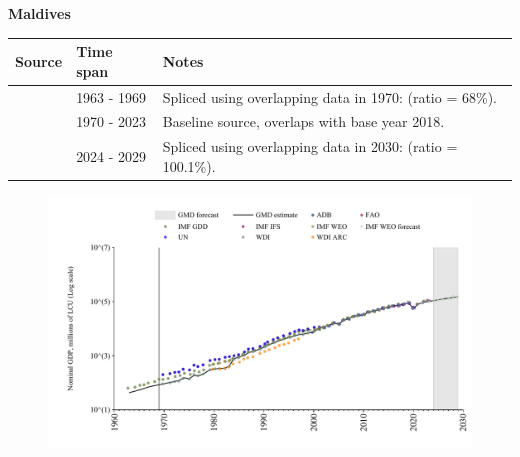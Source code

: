 \documentclass[12pt,a4paper,landscape]{article}
\begin{document}
\begin{adjustbox}{max totalsize={\paperwidth}{\paperheight},center}
\begin{minipage}[t][\textheight][t]{\textwidth}
\vspace*{0.5cm}
{}
\begin{center}
{\Large\bfseries Maldives}
\end{center}
\vspace{0.5cm}
\begin{table}[H]
\centering
\small
\begin{tabular}{|l|l|l|}
\hline
\textbf{Source} & \textbf{Time span} & \textbf{Notes} \\
\hline
\rowcolor{white}\cite{IMF_GDD}& 1963 - 1969 &Spliced using overlapping data in 1970: (ratio = 68\%).\\
\rowcolor{lightgray}\cite{WDI}& 1970 - 2023 &Baseline source, overlaps with base year 2018.\\
\rowcolor{white}\cite{IMF_WEO_forecast}& 2024 - 2029 &Spliced using overlapping data in 2030: (ratio = 100.1\%).\\
\hline
\end{tabular}
\end{table}
\begin{figure}[H]
\centering
\includegraphics[width=\textwidth,height=0.6\textheight,keepaspectratio]{graphs/MDV_nGDP.pdf}
\end{figure}
\end{minipage}
\end{adjustbox}
\end{document}
